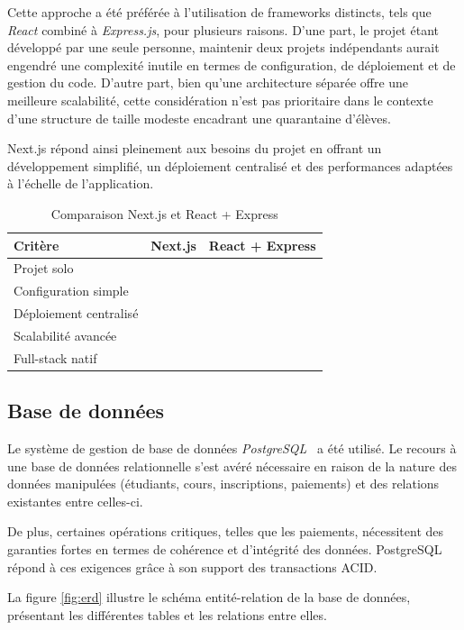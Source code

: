\documentclass{article}
\newcommand{\cmark}{\ding{51}}
\newcommand{\xmark}{\ding{55}}
\begin{document}
Cette approche a été préférée à l'utilisation de frameworks distincts, 
tels que \textit{React} combiné à \textit{Express.js}, pour plusieurs raisons. 
D'une part, le projet étant développé par une seule personne, maintenir deux 
projets indépendants aurait engendré une complexité inutile en termes de 
configuration, de déploiement et de gestion du code. D'autre part, bien qu'une 
architecture séparée offre une meilleure scalabilité, cette considération n'est 
pas prioritaire dans le contexte d'une structure de taille modeste encadrant 
une quarantaine d'élèves.

Next.js répond ainsi pleinement aux besoins du projet en offrant un 
développement simplifié, un déploiement centralisé et des performances 
adaptées à l'échelle de l'application.

\begin{table}[h]
\centering
\begin{tabular}{lcc}
\toprule
\textbf{Critère} & \textbf{Next.js} & \textbf{React + Express} \\
\midrule
Projet solo & \cmark & \xmark \\
Configuration simple & \cmark & \xmark \\
Déploiement centralisé & \cmark & \xmark \\
Scalabilité avancée & \xmark & \cmark \\
Full-stack natif & \cmark & \xmark \\
\bottomrule
\end{tabular}
\caption{Comparaison Next.js et React + Express}
\label{tab:framework}
\end{table}

\subsection{Base de données}

Le système de gestion de base de données \textit{PostgreSQL}~\cite{postgresql} a été utilisé. Le recours à une base de données relationnelle s’est avéré nécessaire en raison de la nature des données manipulées (étudiants, cours, inscriptions, paiements) et des relations existantes entre celles-ci.

De plus, certaines opérations critiques, telles que les paiements, nécessitent des garanties fortes en termes de cohérence et d’intégrité des données. PostgreSQL répond à ces exigences grâce à son support des transactions ACID.

La figure \ref{fig:erd} illustre le schéma entité-relation de 
la base de données, présentant les différentes tables et les 
relations entre elles.
\end{document}
